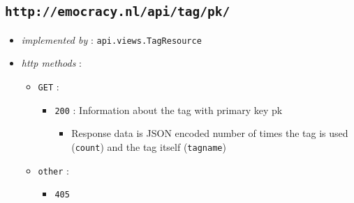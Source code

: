 \documentclass[a4paper]{report}
\begin{document}
\subsection{\texttt{http://emocracy.nl/api/tag/\textsf{pk}/}}
\begin{itemize}
    \item{\textsl{implemented by} : \texttt{api.views.TagResource}}
    \item{\textsl{http methods} :
        \begin{itemize}
            \item{\texttt{GET} :
                \begin{itemize}
                    \item{\texttt{200} : Information about the tag with primary key \textsf{pk}}
                    \begin{itemize}
                        \item{Response data is JSON encoded number of times the
                        tag is used (\texttt{count}) and the tag itself (\texttt{tagname})}
                    \end{itemize}
                \end{itemize}
            }
            
            \item{\texttt{other} :
                \begin{itemize}
                    \item{\texttt{405}}
                \end{itemize}
            }
        \end{itemize}
    }
\end{itemize}
\end{document}
